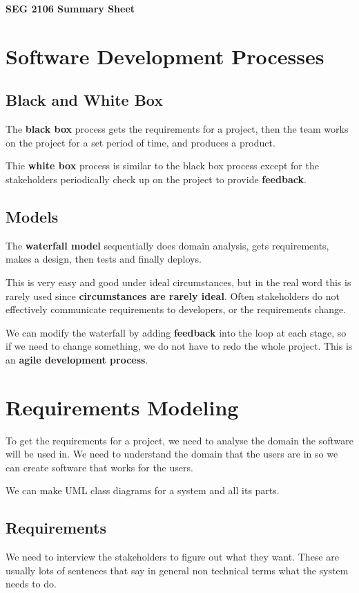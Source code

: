 \documentclass[12pt,letterpaper]{article} \usepackage{amsmath} \usepackage{graphicx} \usepackage[margin=1in]{geometry} \usepackage{longtable}  \usepackage{amssymb}
\begin{document}
	
	\begin{center}
		\Large\textbf{SEG 2106 Summary Sheet} \\
		\vspace{0.5em}
	\end{center}
	
	\section {Software Development Processes}
	\subsection{Black and White Box}
	The \textbf{black box} process gets the requirements for a project, then the team works on the project for a set period of time, and produces a product. 
	
	Thie \textbf{white box} process is similar to the black box process except for the stakeholders periodically check up on the project to provide \textbf{feedback}. 
	
	\subsection{Models}
	The \textbf{waterfall model} sequentially does domain analysis, gets requirements, makes a design, then tests and finally deploys. 
	
	This is very easy and good under ideal circumstances, but in the real word this is rarely used since \textbf{circumstances are rarely ideal}. Often stakeholders do not effectively communicate requirements to developers, or the requirements change. 
	
	We can modify the waterfall by adding \textbf{feedback} into the loop at each stage, so if we need to change something, we do not have to redo the whole project. This is an \textbf{agile development process}. 
	
	\section{Requirements Modeling}
	To get the requirements for a project, we need to analyse the domain the software will be used in. We need to understand the domain that the users are in so we can create software that works for the users. 
	
	We can make UML class diagrams for a system and all its parts. 
	
	\subsection{Requirements}
	We need to interview the stakeholders to figure out what they want. These are usually lots of sentences that say in general non technical terms what the system needs to do. 
	
\end{document}
